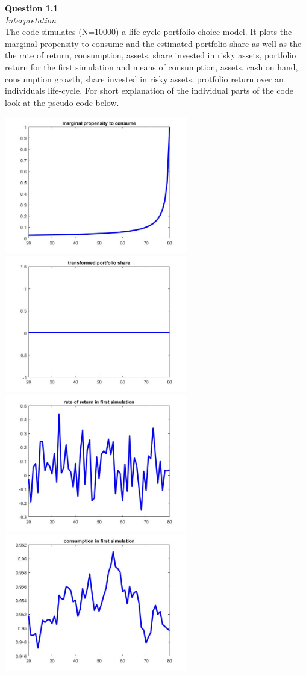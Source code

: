 \documentclass[a4paper,9pt, parskip=half-]{scrartcl}
\begin{document}
\textbf{Question 1.1}\\
\textit{Interpretation}\\
The code simulates (N=10000) a life-cycle portfolio choice model. It plots the marginal propensity to consume and the estimated portfolio share as well as the the rate of return, consumption, assets, share invested in risky assets, portfolio return for the first simulation and means of consumption, assets, cash on hand, consumption growth, share invested in risky assets, protfolio return over an individuals life-cycle. For short explanation of the individual parts of the code look at the pseudo code below.

\begin{center}
\includegraphics[width=8cm]{Pic1}\includegraphics[width=8cm]{Pic2}\\
\includegraphics[width=8cm]{Pic3}\includegraphics[width=8cm]{Pic4}\\

\end{center}
\end{document}
